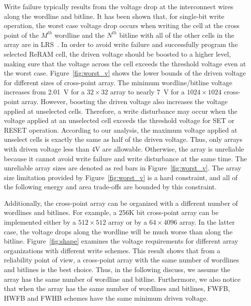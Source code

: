 Write failure typically results from the voltage drop at the interconnect
wires along the wordline and bitline. It has been shown that, for
single-bit write operation, the worst case voltage drop occurs when
writing the cell at the cross point of the $M^{th}$ wordline and the
$N^{th}$ bitline with all of the other cells in the array are in
LRS~\cite{crossbar_TED_2010}. In order to avoid write failure and
successfully program the selected ReRAM cell, the driven voltage should be
boosted to a higher level, making sure that the voltage across the cell
exceeds the threshold voltage even at the worst case.
Figure~\ref{fig:worst_v} shows the lower bounds of the driven voltage for
different sizes of cross-point array. The minimum wordline/bitline voltage
increases from 2.01~V for a $32 \times 32$ array to nearly 7~V for a $1024
\times 1024$ cross-point array. However, boosting the driven voltage also
increases the voltage applied at unselected cells. Therefore, a write
disturbance may occur when the voltage applied at an unselected cell
exceeds the threshold voltage for SET or RESET operation. According to our
analysis, the maximum voltage applied at unselect cells is exactly the
same as half of the driven voltage. Thus, only arrays with driven voltage
less than 4V are allowable. Otherwise, the array is unreliable because it
cannot avoid write failure and write disturbance at the same time. The
unreliable array sizes are denoted as red bars in
Figure~\ref{fig:worst_v}. The array size limitation provided by
Figure~\ref{fig:worst_v} is a hard constraint, and all of the following
energy and area trade-offs are bounded by this constraint.

Additionally, the cross-point array can be organized with a different
number of wordlines and bitlines. For example, a 256K bit cross-point
array can be implemented either by a $512 \times 512$ array or by a $64
\times 4096$ array. In the latter case, the voltage drops along the
wordline will be much worse than along the bitline. Figure~\ref{fig:shape}
examines the voltage requirements for different array organizations with
different write schemes. This result shows that from a reliability point
of view, a cross-point array with the same number of wordlines and
bitlines is the best choice. Thus, in the following discuss, we assume the
array has the same number of wordline and bitline. Furthermore, we also
notice that when the array has the same number of wordlines and bitlines,
FWFB, HWFB and FWHB schemes have the same minimum driven voltage.


